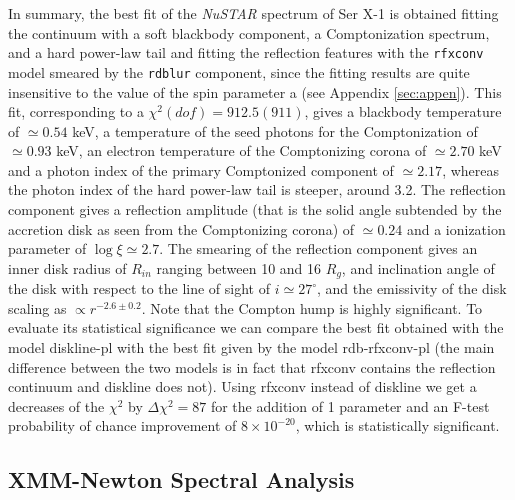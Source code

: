 \documentclass{aa}
\begin{document}
In summary, the best fit of the \emph{NuSTAR} spectrum of Ser X-1 is obtained
fitting the continuum with a soft blackbody component, a Comptonization 
spectrum, and a hard power-law tail and fitting the reflection features 
with the \texttt{rfxconv} model smeared by the \texttt{rdblur} component,
since the fitting results are quite insensitive to the value of the 
spin parameter a (see Appendix \ref{sec:appen}). This fit, corresponding 
to a $\chi^2(dof) = 912.5(911)$, gives a blackbody temperature of 
$\simeq 0.54$ keV, a temperature of the seed photons for the Comptonization 
of $\simeq 0.93$ keV, an electron temperature of the Comptonizing corona of 
$\simeq 2.70$ keV and a photon index of the primary Comptonized component 
of $\simeq 2.17$, whereas the photon index of the hard power-law tail is 
steeper, around 3.2.
The reflection component gives a reflection amplitude (that is the 
solid angle subtended by the accretion disk as seen from the Comptonizing 
corona) of $\simeq 0.24$ and a ionization parameter of $\log \xi \simeq 2.7$. 
The smearing of the reflection component gives an
inner disk radius of $R_{in}$ ranging between 10 and 16 $R_g$, and 
inclination angle of the disk with respect to the line of sight of 
$i \simeq 27^\circ$, and the emissivity of the disk scaling as 
$\propto r^{-2.6\pm0.2}$.
Note that the Compton hump is highly significant. To evaluate its 
statistical significance we can compare the best fit obtained with the model 
diskline-pl with the best fit given by the model rdb-rfxconv-pl (the main 
difference between the two models is in fact that rfxconv contains the 
reflection continuum and diskline does not). Using rfxconv instead of 
diskline we get a decreases of the $\chi^2$ by $\Delta \chi^2 = 87$ 
for the addition of 1 parameter and an F-test probability of chance 
improvement of $8 \times 10^{-20}$, which is statistically significant. 



\subsection{XMM-Newton Spectral Analysis}
\label{sec:xmm} 
\end{document}
